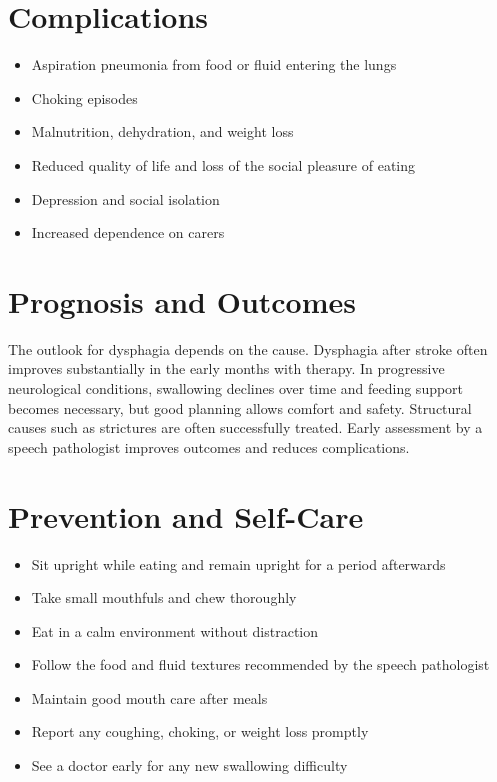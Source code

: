 \section*{Complications}
\begin{itemize}
    \item Aspiration pneumonia from food or fluid entering the lungs
    \item Choking episodes
    \item Malnutrition, dehydration, and weight loss
    \item Reduced quality of life and loss of the social pleasure of eating
    \item Depression and social isolation
    \item Increased dependence on carers
\end{itemize}

\section*{Prognosis and Outcomes}
The outlook for dysphagia depends on the cause. Dysphagia after stroke often improves substantially in the early months with therapy. In progressive neurological conditions, swallowing declines over time and feeding support becomes necessary, but good planning allows comfort and safety. Structural causes such as strictures are often successfully treated. Early assessment by a speech pathologist improves outcomes and reduces complications.

\section*{Prevention and Self-Care}
\begin{itemize}
    \item Sit upright while eating and remain upright for a period afterwards
    \item Take small mouthfuls and chew thoroughly
    \item Eat in a calm environment without distraction
    \item Follow the food and fluid textures recommended by the speech pathologist
    \item Maintain good mouth care after meals
    \item Report any coughing, choking, or weight loss promptly
    \item See a doctor early for any new swallowing difficulty
\end{itemize}

